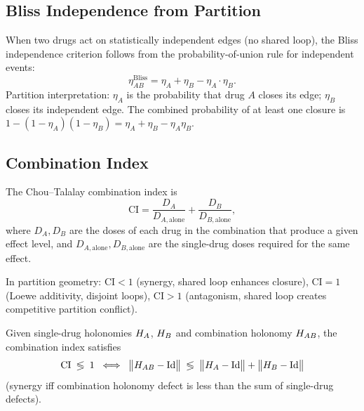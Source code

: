 \subsection{Bliss Independence from Partition}
\label{subsec:ch09-bliss}

When two drugs act on statistically independent edges (no shared loop), the
Bliss independence criterion follows from the probability-of-union rule for
independent events:
\begin{equation}
  \eta_{AB}^{\mathrm{Bliss}} = \eta_A + \eta_B - \eta_A\cdot\eta_B.
  \label{eq:ch09-bliss}
\end{equation}
Partition interpretation: $\eta_A$ is the probability that drug $A$ closes
its edge; $\eta_B$ closes its independent edge.  The combined probability
of at least one closure is $1 - (1-\eta_A)(1-\eta_B) = \eta_A + \eta_B -
\eta_A\eta_B$.

\subsection{Combination Index}
\label{subsec:ch09-CI}

\begin{definition}
\label{def:ch09-CI}
The Chou--Talalay combination index is
\begin{equation}
  \mathrm{CI} = \frac{D_A}{D_{A,\mathrm{alone}}} + \frac{D_B}{D_{B,\mathrm{alone}}},
  \label{eq:ch09-CI}
\end{equation}
where $D_A, D_B$ are the doses of each drug in the combination that produce
a given effect level, and $D_{A,\mathrm{alone}}, D_{B,\mathrm{alone}}$ are
the single-drug doses required for the same effect.
\end{definition}

In partition geometry: $\mathrm{CI} < 1$ (synergy, shared loop enhances
closure), $\mathrm{CI} = 1$ (Loewe additivity, disjoint loops), $\mathrm{CI}
> 1$ (antagonism, shared loop creates competitive partition conflict).

\begin{theorem}
\label{thm:ch09-synergy-detect}
Given single-drug holonomies $H_A$, $H_B$ and combination holonomy
$H_{AB}$, the combination index satisfies
\begin{equation}
  \mathrm{CI} \;\lessgtr\; 1 \;\iff\;
  \bigl\|H_{AB} - \mathrm{Id}\bigr\| \;\lessgtr\;
  \bigl\|H_A - \mathrm{Id}\bigr\| + \bigl\|H_B - \mathrm{Id}\bigr\|
  \label{eq:ch09-CI-holonomy}
\end{equation}
(synergy iff combination holonomy defect is less than the sum of single-drug
defects).
\end{theorem}

